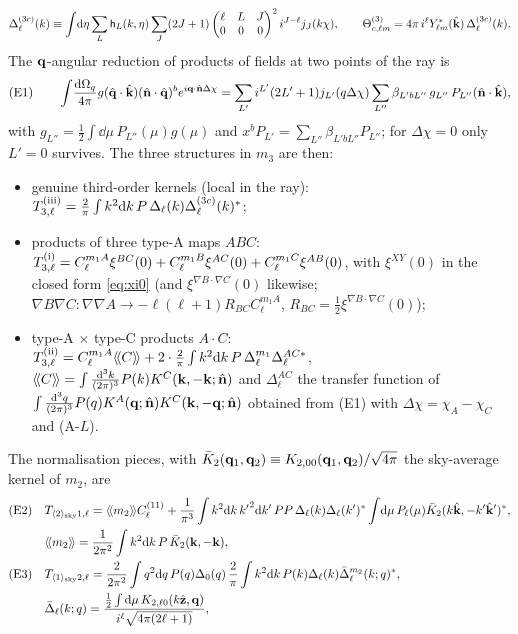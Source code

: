\begin{equation}
\Delta^{(3c)}_\ell(k)\equiv\int\!\mathrm d\eta\sum_L\mathsf h_L(k,\eta)\sum_{J}(2J+1)\begin{pmatrix}\ell&L&J\\0&0&0\end{pmatrix}^2i^{J-\ell}j_J(k\chi),
\qquad \Theta^{(3)}_{c,\ell m}=4\pi\,i^\ell Y^*_{\ell m}(\hat{\mathbf k})\,\Delta^{(3c)}_\ell(k).
\label{eq:Delta3c}
\end{equation}
The $\mathbf q$-angular reduction of products of fields at two points of the ray is
\begin{equation}
\text{(E1)}\qquad \int\!\frac{\mathrm d\Omega_q}{4\pi}g(\hat{\mathbf q}\cdot\hat{\mathbf k})(\hat{\mathbf n}\cdot\hat{\mathbf q})^be^{i\mathbf q\cdot\hat{\mathbf n}\Delta\chi}
=\sum_{L'}i^{L'}(2L'+1)j_{L'}(q\Delta\chi)\sum_{L''}\beta_{L'bL''}\,g_{L''}\,P_{L''}(\hat{\mathbf n}\cdot\hat{\mathbf k}),
\label{eq:E1}
\end{equation}
with $g_{L''}=\tfrac12\int\dd\mu\,P_{L''}(\mu)g(\mu)$ and $x^bP_{L'}=\sum_{L''}\beta_{L'bL''}P_{L''}$; for $\Delta\chi=0$ only
$L'=0$ survives.  The three structures in $m_3$ are then:
\begin{itemize}
\item[(iii)] genuine third-order kernels (local in the ray): $T^{\rm(iii)}_{3,\ell}=\frac2\pi\int k^2\mathrm d k\,P\,\Delta_\ell(k)\Delta^{(3c)}_\ell(k)^*$;
\item[(i)] products of three type-A maps $ABC$: $T^{\rm(i)}_{3,\ell}=C^{m_1A}_\ell\xi^{BC}(0)+C^{m_1B}_\ell\xi^{AC}(0)+C^{m_1C}_\ell\xi^{AB}(0)$, with
$\xi^{XY}(0)$ in the closed form \eqref{eq:xi0} (and $\xi^{\nabla B\cdot\nabla C}(0)$ likewise; $\nabla B\nabla C\!:\!\nabla\nabla A\to-\ell(\ell+1)R_{BC}C^{m_1A}_\ell$,
$R_{BC}=\tfrac12\xi^{\nabla B\cdot\nabla C}(0)$);
\item[(ii)] type-A $\times$ type-C products $A\cdot C$: $T^{\rm(ii)}_{3,\ell}=C^{m_1A}_\ell\langle\!\langle C\rangle\!\rangle+2\cdot\frac2\pi\int k^2\mathrm d k\,P\,\Delta^{m_1}_\ell\Delta^{AC*}_\ell$,
$\langle\!\langle C\rangle\!\rangle=\int\frac{\mathrm d^3k}{(2\pi)^3}P(k)K^C(\mathbf k,-\mathbf k;\hat{\mathbf n})$ and $\Delta^{AC}_\ell$ the transfer function of
$\int\frac{\mathrm d^3q}{(2\pi)^3}P(q)K^A(\mathbf q;\hat{\mathbf n})K^C(\mathbf k,-\mathbf q;\hat{\mathbf n})$ obtained from (E1) with $\Delta\chi=\chi_A-\chi_C$ and (A-$L$).
\end{itemize}
The normalisation pieces, with $\bar K_2(\mathbf q_1,\mathbf q_2)\equiv K_{2,00}(\mathbf q_1,\mathbf q_2)/\sqrt{4\pi}$ the sky-average kernel of $m_2$, are
\begin{align}
\text{(E2)}&\quad T_{\langle 2\rangle_{\rm sky}1,\ell}=\langle\!\langle m_2\rangle\!\rangle C^{(11)}_\ell+\frac1{\pi^3}\int k^2\mathrm d k\,{k'}^2\mathrm d k'\,PP\,\Delta_\ell(k)\Delta_\ell(k')^*\int\!\mathrm d\mu\,P_\ell(\mu)\bar K_2(k\hat{\mathbf k},-k'\hat{\mathbf k}')^*,\nonumber\\
&\quad \langle\!\langle m_2\rangle\!\rangle=\frac1{2\pi^2}\int k^2\mathrm d k\,P\,\bar K_2(\mathbf k,-\mathbf k),\nonumber\\
\text{(E3)}&\quad T_{\langle 1\rangle_{\rm sky}2,\ell}=\frac2{2\pi^2}\int q^2\mathrm d q\,P(q)\Delta_0(q)\,\frac2\pi\int k^2\mathrm d k\,P(k)\Delta_\ell(k)\bar\Delta^{m_2}_\ell(k;q)^*,\nonumber\\
&\quad\bar\Delta_\ell(k;q)=\frac{\tfrac12\int\mathrm d\mu\,K_{2,\ell0}(k\hat{\mathbf z},\mathbf q)}{i^\ell\sqrt{4\pi(2\ell+1)}},
\label{eq:E2E3}
\end{align}
